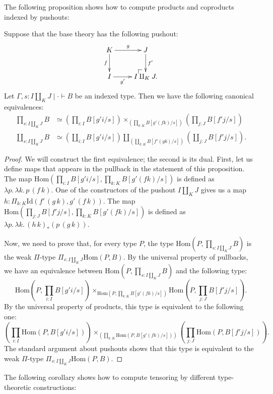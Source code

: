 \documentclass[reqno]{mscs}
\makeatletter
\newcommand{\ob}{}
\newcommand{\fs}[1]{\mathrm{#1}}
\newcommand{\Hom}{\fs{Hom}}
\newcommand{\Id}{\fs{Id}}
\numberwithin{figure}{section}
\newcommand{\po}[1][dr]{\save*!/#1+1.2pc/#1:(1,-1)@^{|-}\restore}
\makeatother
\begin{document}
The following proposition shows how to compute products and coproducts indexed by pushouts:

\begin{prop}
Suppose that the base theory has the following pushout:
\[ \xymatrix{ K \ar[r]^-g \ar[d]_-f & J \ar[d]^-{f'} \\
              I \ar[r]_-{g'}        & \po I \amalg_K J.
            } \]
Let $\Gamma, s : I \amalg_K J \mid \cdot \vdash B \ob$ be an indexed type.
Then we have the following canonical equivalences:
\begin{align*}
\prod_{s : I \amalg_K J} B & \simeq (\prod_{i : I} B[g' i/s]) \times_{(\prod_{k : K} B[g' (f k) / s])} (\prod_{j : J} B[f' j/s]) \\
\coprod_{s : I \amalg_K J} B & \simeq (\coprod_{i : I} B[g' i/s]) \amalg_{(\coprod_{k : K} B[f' (g k) / s])} (\coprod_{j : J} B[f' j/s]).
\end{align*}
\end{prop}
\begin{proof}
We will construct the first equivalence; the second is its dual.
First, let us define maps that appears in the pullback in the statement of this proposition.
The map $\Hom(\prod_{i : I} B[g' i/s], \prod_{k : K} B[g' (f k) / s])$ is defined as $\lambda p.\,\lambda k.\,p\,(f\,k)$.
One of the constructors of the pushout $I \amalg_K J$ gives us a map $h : \Pi_{k : K} \Id(f'\,(g\,k),g'\,(f\,k))$.
The map $\Hom(\prod_{j : J} B[f' j/s], \prod_{k : K} B[g' (f k) / s])$ is defined as $\lambda p.\,\lambda k.\,(h\,k)_*(p\,(g\,k))$.

Now, we need to prove that, for every type $P$, the type $\Hom(P, \prod_{s : I \amalg_K J} B)$ is the weak $\Pi$-type $\Pi_{s : I \amalg_K J} \Hom(P,B)$.
By the universal property of pullbacks, we have an equivalence between $\Hom(P, \prod_{s : I \amalg_K J} B)$ and the following type:
\[ \Hom(P, \prod_{i : I} B[g' i/s]) \times_{\Hom(P, \prod_{k : K} B[g' (f k) / s])} \Hom(P, \prod_{j : J} B[f' j/s]). \]
By the universal property of products, this type is equivalent to the following one:
\[ (\prod_{i : I} \Hom(P, B[g' i/s])) \times_{(\prod_{k : K} \Hom(P, B[g' (f k) / s]))} (\prod_{j : J} \Hom(P, B[f' j/s])). \]
The standard argument about pushouts shows that this type is equivalent to the weak $\Pi$-type $\Pi_{s : I \amalg_K J} \Hom(P,B)$.
\end{proof}

The following corollary shows how to compute tensoring by different type-theoretic constructions:
\end{document}
